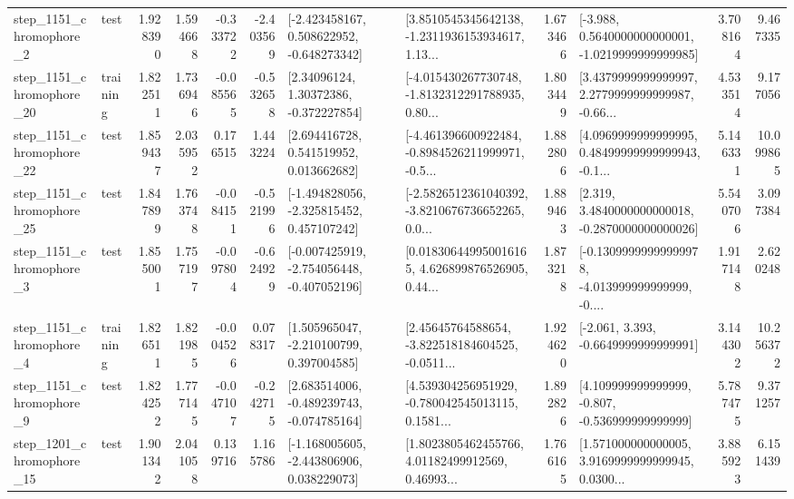 \begin{tabular}{llrrrrllrlrr}
  step\_1151\_chromophore\_2 &      test &      1.928390 &    1.594668 &     -0.333722 & -2.403569 &   [-2.423458167, 0.508622952, -0.648273342] &  [3.8510545345642138, -1.2311936153934617, 1.13... &       1.673466 &  [-3.988, 0.5640000000000001, -1.0219999999999985] &            3.708164 &          9.467335 \\
 step\_1151\_chromophore\_20 &  training &      1.822511 &    1.736946 &     -0.085565 & -0.532658 &      [2.34096124, 1.30372386, -0.372227854] &  [-4.015430267730748, -1.8132312291788935, 0.80... &       1.803449 &  [3.4379999999999997, 2.2779999999999987, -0.66... &            4.533514 &          9.177056 \\
 step\_1151\_chromophore\_22 &      test &      1.859437 &    2.035952 &      0.176515 &  1.443224 &     [2.694416728, 0.541519952, 0.013662682] &  [-4.461396600922484, -0.8984526211999971, -0.5... &       1.882806 &  [4.0969999999999995, 0.48499999999999943, -0.1... &            5.146331 &         10.099865 \\
 step\_1151\_chromophore\_25 &      test &      1.847899 &    1.763748 &     -0.084151 & -0.521996 &   [-1.494828056, -2.325815452, 0.457107242] &  [-2.5826512361040392, -3.8210676736652265, 0.0... &       1.889463 &   [2.319, 3.4840000000000018, -0.2870000000000026] &            5.540706 &          3.097384 \\
  step\_1151\_chromophore\_3 &      test &      1.855001 &    1.757197 &     -0.097804 & -0.624929 &  [-0.007425919, -2.754056448, -0.407052196] &  [0.018306449950016165, 4.626899876526905, 0.44... &       1.873218 &  [-0.13099999999999978, -4.013999999999999, -0.... &            1.917148 &          2.620248 \\
  step\_1151\_chromophore\_4 &  training &      1.826511 &    1.821985 &     -0.004526 &  0.078317 &    [1.505965047, -2.210100799, 0.397004585] &  [2.45645764588654, -3.822518184604525, -0.0511... &       1.924620 &               [-2.061, 3.393, -0.6649999999999991] &            3.144302 &         10.256372 \\
  step\_1151\_chromophore\_9 &      test &      1.824252 &    1.777145 &     -0.047107 & -0.242715 &   [2.683514006, -0.489239743, -0.074785164] &  [4.539304256951929, -0.780042545013115, 0.1581... &       1.892826 &    [4.109999999999999, -0.807, -0.536999999999999] &            5.787475 &          9.371257 \\
 step\_1201\_chromophore\_15 &      test &      1.901342 &    2.041058 &      0.139716 &  1.165786 &   [-1.168005605, -2.443806906, 0.038229073] &  [1.8023805462455766, 4.01182499912569, 0.46993... &       1.766165 &  [1.571000000000005, 3.9169999999999945, 0.0300... &            3.885923 &          6.151439 \\

\end{tabular}
